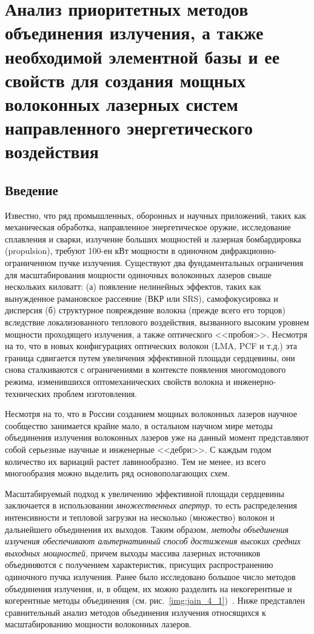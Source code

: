 \chapter{Анализ приоритетных методов объединения излучения, а также необходимой элементной базы и ее свойств для создания мощных волоконных лазерных систем направленного энергетического воздействия}
\label{ch1}

\section{Введение}

Известно, что ряд промышленных, оборонных и научных приложений, таких как механическая обработка, направленное энергетическое оружие, исследование сплавления и сварки, излучение больших мощностей и лазерная бомбардировка (propulsion), требуют 100-ен кВт мощности в одиночном дифракционно-ограниченном пучке излучения. Существуют два фундаментальных ограничения для масштабирования мощности одиночных волоконных лазеров свыше нескольких киловатт: (а) появление нелинейных эффектов, таких как вынужденное рамановское рассеяние (ВКР или SRS), самофокусировка и дисперсия (б) структурное повреждение волокна (прежде всего его торцов) вследствие локализованного теплового воздействия, вызванного высоким уровнем мощности проходящего излучения, а также оптического <<пробоя>>. Несмотря на то, что в новых конфигурациях оптических волокон (LMA, PCF и т.д.) эта граница сдвигается путем увеличения эффективной площади сердцевины, они снова сталкиваются с ограничениями в контексте появления многомодового режима, изменившихся оптомеханических свойств волокна и инженерно-технических проблем изготовления.

Несмотря на то, что в России созданием мощных волоконных лазеров научное сообщество занимается крайне мало, в остальном научном мире методы объединения излучения волоконных лазеров уже на данный момент представляют собой серьезные научные и инженерные <<дебри>>. С каждым годом количество их вариаций  растет лавинообразно. Тем не менее, из всего многообразия можно выделить ряд основополагающих схем.

Масштабируемый подход к увеличению эффективной площади сердцевины заключается в использовании \textit{множественных апертур}, то есть распределения интенсивности и тепловой загрузки на несколько (множество) волокон и дальнейшего объединения их выходов. Таким образом, \textit{методы объединения излучения обеспечивают альтернативный способ достижения высоких средних выходных мощностей}, причем выходы массива лазерных источников объединяются с получением характеристик, присущих распространению одиночного пучка излучения. Ранее было исследовано большое число методов объединения излучения, и, в общем, их можно разделить на некогерентные и когерентные методы объединения (см. рис.~\ref{img:jain_4_1})~\cite{Jain95}. Ниже представлен сравнительный анализ методов объединения излучения относящихся к масштабированию мощности волоконных лазеров.

